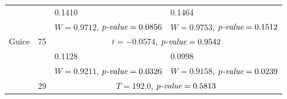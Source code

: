 \documentclass[twoside,a4paper,11pt]{memoir}
\begin{document}
\begin{table}[]
\begin{adjustbox}{center}
\begin{tabular}{llll}
 &  & 0.1410 & 0.1464 \\
 &  & $W = 0.9712$, $p\emph{-value} = 0.0856$ & $W = 0.9753$, $p\emph{-value} = 0.1512$ \\
\multirow{-3}{*}{Guice} & \multirow{-3}{*}{75} & \multicolumn{2}{c}{$t = -0.0574$, $p\emph{-value} = 0.9542$} \\
\rowcolor{Gray}
\cellcolor{Gray} & \cellcolor{Gray} & 0.1128 & 0.0998 \\
\rowcolor{Gray}
\cellcolor{Gray} & \cellcolor{Gray} & $W = 0.9211$, $p\emph{-value} = 0.0326$ & $W = 0.9158$, $p\emph{-value} = 0.0239$ \\
\rowcolor{Gray}
\multirow{-3}{*}{\cellcolor{Gray}Jsoup} & \multirow{-3}{*}{\cellcolor{Gray}29} & \multicolumn{2}{c}{\cellcolor{Gray}$T = 192.0$, $p\emph{-value} = 0.5813$}\\
\bottomrule
\end{tabular}
\end{adjustbox}
\end{table}
\end{document}
